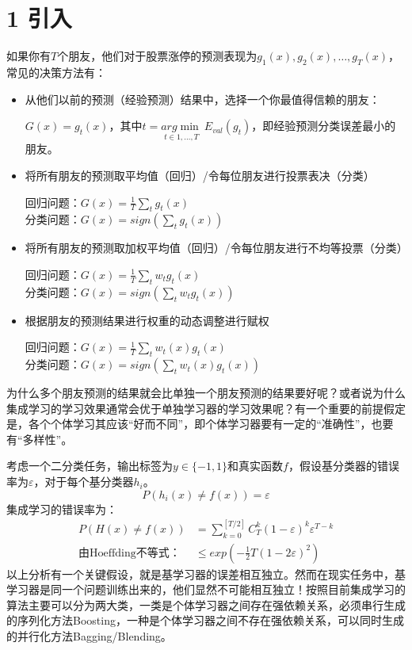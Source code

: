 \documentclass[twoside]{article}
\begin{document}
\section*{1 引入}
如果你有$T$个朋友，他们对于股票涨停的预测表现为$g_1(x),g_2(x),\ldots,g_T(x)$，常见的决策方法有：
\begin{itemize}
    \item 从他们以前的预测（经验预测）结果中，选择一个你最值得信赖的朋友：
    \begin{center}
        $G(x)=g_{t}(x)$，其中$t=\underset{t \in {1,\ldots,T}}{arg\min}~E_{val}(g_t)$，即经验预测分类误差最小的朋友。
    \end{center}
    \item 将所有朋友的预测取平均值（回归）/令每位朋友进行投票表决（分类）
    \begin{center}
        回归问题：$G(x)=\frac{1}{T}\sum_t g_t(x)$\\
        分类问题：$G(x)=sign(\sum_t g_t(x))$
    \end{center}
    \item 将所有朋友的预测取加权平均值（回归）/令每位朋友进行不均等投票（分类）
    \begin{center}
        回归问题：$G(x)=\frac{1}{T}\sum_t w_t g_t(x)$\\
        分类问题：$G(x)=sign(\sum_t w_t g_t(x))$
    \end{center}
    \item 根据朋友的预测结果进行权重的动态调整进行赋权
    \begin{center}
        回归问题：$G(x)=\frac{1}{T}\sum_t w_t(x) g_t(x)$\\
        分类问题：$G(x)=sign(\sum_t w_t(x) g_t(x))$
    \end{center}
\end{itemize}
为什么多个朋友预测的结果就会比单独一个朋友预测的结果要好呢？或者说为什么集成学习的学习效果通常会优于单独学习器的学习效果呢？有一个重要的前提假定是，各个个体学习其应该“好而不同”，即个体学习器要有一定的“准确性”，也要有“多样性”。

考虑一个二分类任务，输出标签为$y \in \{-1,1\}$和真实函数$f$，假设基分类器的错误率为$\varepsilon$，对于每个基分类器$h_i$。
\begin{equation*}
    P(h_i(x)\neq f(x))=\varepsilon
\end{equation*}
集成学习的错误率为：
\begin{equation*}
    \begin{aligned}
        P(H(x)\neq f(x))&=\sum_{k=0}^{[T/2]}C_T^k(1-\varepsilon)^k \varepsilon^{T-k}
        \\
        \text{由Hoeffding不等式：}&\le exp\left(-\frac{1}{2}T(1-2\varepsilon)^2\right)
    \end{aligned}
\end{equation*}
以上分析有一个关键假设，就是基学习器的误差相互独立。然而在现实任务中，基学习器是同一个问题训练出来的，他们显然不可能相互独立！按照目前集成学习的算法主要可以分为两大类，一类是个体学习器之间存在强依赖关系，必须串行生成的序列化方法Boosting，一种是个体学习器之间不存在强依赖关系，可以同时生成的并行化方法Bagging/Blending。
\end{document}
